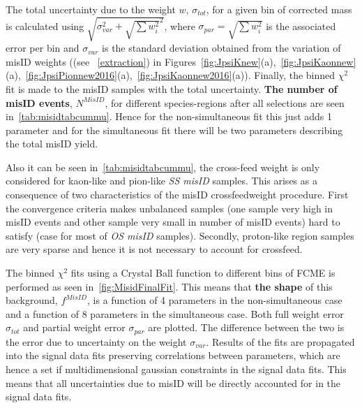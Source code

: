 The total uncertainty due to the weight $w$, $\sigma_{tot}$, for a given bin of corrected mass is calculated using $\sqrt{\sigma_{var}^2 +\sqrt{\sum{w^{2}_{i}}}^{2}}$, where $\sigma_{par}=\sqrt{\sum{w^{2}_{i}}}$ is the associated error per bin and $\sigma_{var}$ is the standard deviation obtained from the variation of misID weights ((see ~\autoref{extraction}) in Figures~\ref{fig:JpsiKnew}(a),~\ref{fig:JpsiKaonnew}(a),~\ref{fig:JpsiPionnew2016}(a),~\ref{fig:JpsiKaonnew2016}(a)). Finally, the binned $\chi^{2}$ fit is made to the misID samples with the total uncertainty. \textbf{The number of misID events}, $N^{MisID}$, for different species-regions after all selections are seen in~\autoref{tab:misidtabcummu}. Hence for the non-simultaneous fit this just adds 1 parameter and for the simultaneous fit there will be two parameters describing the total misID yield.

Also it can be seen in~\autoref{tab:misidtabcummu}, the cross-feed weight is only considered for kaon-like and pion-like \textit{SS misID} samples. This arises as a consequence of two characteristics of the misID crossfeedweight procedure. First the convergence criteria makes unbalanced samples (one sample very high in misID events and other sample very small in number of misID events) hard to satisfy (case for most of \textit{OS misID} samples). Secondly, proton-like region samples are very sparse and hence it is not necessary to account for crossfeed. %

The binned $\chi^{2}$ fits using a Crystal Ball function to different bins of FCME is performed as seen in~\autoref{fig:MisidFinalFit}. This means that \textbf{the shape} of this background, $f^{MisID}$, is a function of 4 parameters in the non-simultaneous case and a function of 8 parameters in the simultaneous case. Both full weight error $\sigma_{tot}$ and partial weight error $\sigma_{par}$ are plotted. The difference between the two is the error due to uncertainty on the weight $\sigma_{var}$.  Results of the fits are propagated into the signal data fits preserving correlations between parameters, which are hence a set if multidimensional gaussian constraints in the signal data fits. This means that all uncertainties due to misID will be directly accounted for in the signal data fits.


